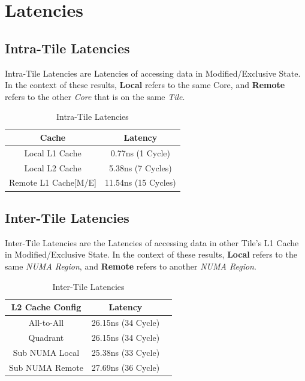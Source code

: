 \documentclass[bsc,frontabs,twoside,singlespacing,parskip,deptreport]{infthesis}     %
\begin{document}
\section{Latencies}

\subsection{Intra-Tile Latencies}
Intra-Tile Latencies are Latencies of accessing data in Modified/Exclusive State. In the context of these results, \textbf{Local} refers to the same Core, and \textbf{Remote} refers to the other \emph{Core} that is on the same \emph{Tile}.
\begin{table}[!h]
\begin{center}
\caption{Intra-Tile Latencies}
\label{fig:intra-tile-latencies}
\begin{tabular}{ |c|c| } 
    \hline
    Cache & Latency \\
    \hline
    Local L1 Cache & 0.77ns (1 Cycle) \\
    Local L2 Cache & 5.38ns (7 Cycles) \\
    Remote L1 Cache[M/E] & 11.54ns (15 Cycles) \\
    \hline
\end{tabular}
\end{center}
\end{table}

\subsection{Inter-Tile Latencies}
 Inter-Tile Latencies are the Latencies of accessing data in other Tile's L1 Cache in Modified/Exclusive State. In the context of these results, \textbf{Local} refers to the same \emph{NUMA Region}, and \textbf{Remote} refers to another \emph{NUMA Region}.
\begin{table}[!h]
\begin{center}
\caption{Inter-Tile Latencies}
\label{fig:inter-tile-latencies}
\begin{tabular}{ |c|c|c| } 
    \hline
    L2 Cache Config & Latency \\
    \hline
    All-to-All & 26.15ns (34 Cycle) \\
    Quadrant & 26.15ns (34 Cycle) \\
    Sub NUMA Local & 25.38ns (33 Cycle) \\
    Sub NUMA Remote & 27.69ns (36 Cycle) \\
    \hline
\end{tabular}
\end{center}
\end{table}
\end{document}
